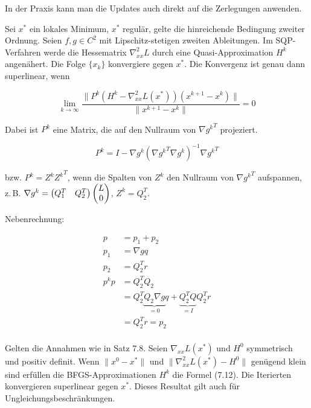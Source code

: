 In der Praxis kann man die Updates auch direkt auf die Zerlegungen anwenden.



Sei $x^*$ ein lokales Minimum, $x^*$ regulär, gelte die hinreichende Bedingung zweiter Ordnung. Seien $f,g \in C^2$ mit Lipschitz-stetigen zweiten Ableitungen. Im SQP-Verfahren werde die Hessematrix $\nabla_{xx}^2 L$ durch eine Quasi-Approximation $H^k$ angenähert. Die Folge $\{x_k\}$ konvergiere gegen $x^*$. Die Konvergenz ist genau dann superlinear, wenn

\[ \lim_{k \to \infty} \frac{\|P^k (H^k - \nabla_{xx}^2 L(x^*)) (x^{k+1} - x^k)\|}{\|x^{k+1} - x^k\|} = 0 \]

Dabei ist $P^k$ eine Matrix, die auf den Nullraum von $\nabla {g^k}^T$ projeziert.


\[ P^k = I - \nabla g^k (\nabla {g^k}^T \nabla g^k)^{-1} \nabla {g^k}^T \]

bzw. $P^k = Z^k {Z^k}^T$, wenn die Spalten von $Z^k$ den Nullraum von ${\nabla g^k}^T$ aufspannen, z.\,B. $\nabla g^k = \begin{pmatrix} Q_1^T & Q_2^T \end{pmatrix} \begin{pmatrix} L \\ 0 \end{pmatrix}$, $Z^k = Q_2^T$.

Nebenrechnung:

\begin{align*}
p &= p_1 + p_2 \\
p_1 &= \nabla g q \\
p_2 &= Q_2^T r \\
p^k p &= Q_2^T Q_2  \\
&= Q_2^T \underbrace{Q_2 \nabla g}_{=0} q + \underbrace{Q_2^T Q}_{=I} Q_2^T r \\
&= Q_2^T r = p_2 \\
\end{align*}



Gelten die Annahmen wie in Satz 7.8. Seien $\nabla_{xx} L(x^*)$ und $H^0$ symmetrisch und positiv definit. Wenn $\|x^0 - x^*\|$ und $\|\nabla_{xx}^2 L(x^*) - H^0\|$ genügend klein sind erfüllen die BFGS-Approximationen $H^k$ die Formel (7.12). Die Iterierten konvergieren superlinear gegen $x^*$. Dieses Resultat gilt auch für Ungleichungsbeschränkungen.


